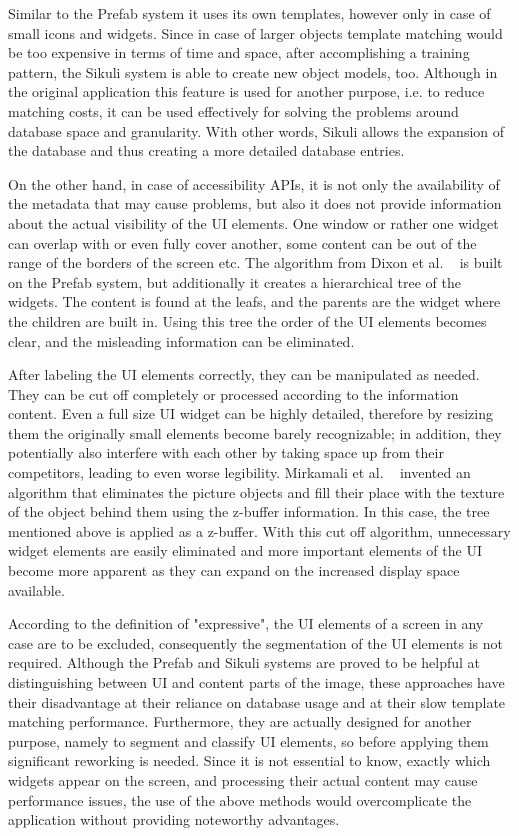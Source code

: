 \documentclass[draft,final]{vutinfth} %
\begin{document}
	Similar to the Prefab system it uses its own templates, however only in case of small icons and widgets.
	Since in case of larger objects template matching would be too expensive in terms of time and space, after accomplishing a training pattern, the Sikuli system is able to create new object models, too.
	Although in the original application this feature is used for another purpose, i.e. to reduce matching costs, it can be used effectively for solving the problems around database space and granularity.
	With other words, Sikuli allows the expansion of the database and thus creating a more detailed database entries.\par	
	On the other hand, in case of accessibility APIs, it is not only the availability of the metadata that may cause problems, but also it does not provide information about the actual visibility of the UI elements.
	One window or rather one widget can overlap with or even fully cover another, some content can be out of the range of the borders of the screen etc.    
	The algorithm from Dixon et al. ~\cite{dixon2011content} is built on the Prefab system, but additionally it creates a hierarchical tree of the widgets. 
	The content is found at the leafs, and the parents are the widget where the children are built in.
	Using this tree the order of the UI elements becomes clear, and the misleading information can be eliminated.\par
	After labeling the UI elements correctly, they can be manipulated as needed.
	They can be cut off completely or processed according to the information content. 
	Even a full size UI widget can be highly detailed, therefore by resizing them the originally small elements become barely recognizable; in addition, they potentially also interfere with each other by taking space up from their competitors, leading to even worse legibility. 
	Mirkamali et al. ~\cite{mirkamali2015object} invented an algorithm that eliminates the picture objects and fill their place with the texture of the object behind them using the z-buffer information.
	In this case, the tree mentioned above is applied as a z-buffer.
	With this cut off algorithm, unnecessary widget elements are easily eliminated and more important elements of the UI become more apparent as they can expand on the increased display space available. \par
	According to the definition of "expressive", the UI elements of a screen in any case are to be excluded, consequently the segmentation of the UI elements is not required.
	Although the Prefab and Sikuli systems are proved to be helpful at distinguishing between UI and content parts of the image, these approaches have their disadvantage at their reliance on database usage and at their slow template matching performance. 
	Furthermore, they are actually designed for another purpose, namely to segment and classify UI elements, so before applying them significant reworking is needed.
	Since it is not essential to know, exactly which widgets appear on the screen, and processing their actual content may cause performance issues, the use of the above methods would overcomplicate the application without providing noteworthy advantages.
	
\end{document}
